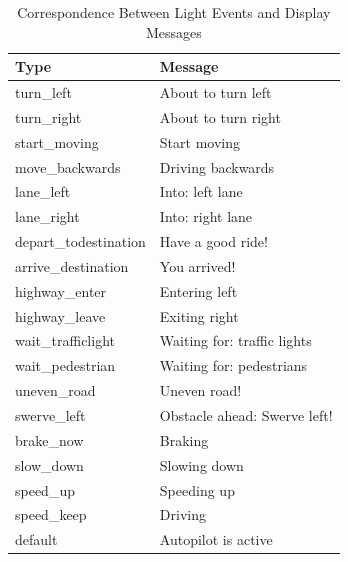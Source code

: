 \begin{table}[ht]
\caption{Correspondence Between Light Events and Display Messages}
\label{tab:display}
\footnotesize
\begin{tabular}{ll}
\toprule
Type        &  Message                      \\
\midrule
turn\_left            & About to turn left           \\
turn\_right           & About to turn right          \\
start\_moving         & Start moving                 \\
move\_backwards       & Driving backwards            \\
lane\_left            & Into: left lane              \\
lane\_right           & Into: right lane             \\
depart\_todestination & Have a good ride!            \\
arrive\_destination   & You arrived!                 \\
highway\_enter        & Entering left                \\
highway\_leave        & Exiting right                \\
wait\_trafficlight    & Waiting for: traffic lights  \\
wait\_pedestrian      & Waiting for: pedestrians     \\
uneven\_road          & Uneven road!                 \\
swerve\_left          & Obstacle ahead: Swerve left! \\
brake\_now            & Braking                      \\
slow\_down            & Slowing down                 \\
speed\_up             & Speeding up                  \\
speed\_keep           & Driving                      \\
default               & Autopilot is active         
\end{tabular}
\end{table}


